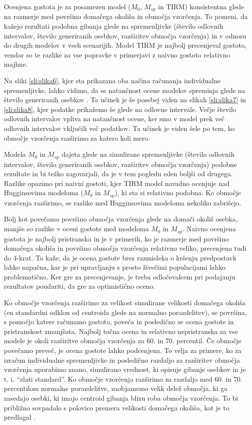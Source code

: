 Ocenjena gostota je za posamezen model ($M_0$, $M_{sp}$ in TIRM) konsistentna glede na razmerje med površino domačega okoliša in območja vzorčenja. To pomeni, da kažejo rezultati podobna gibanja glede na spremenljivke (število odlovnih intervalov, število generiranih osebkov, razširitev območja vzorčenja) in v odnosu do drugih modelov v vseh scenarijih. Model TIRM je najbolj precenjeval gostoto, vendar so te razlike za vse popravke v primerjavi z naivno gostoto relativno majhne.

Na sliki \ref{sli:slika6}, kjer sta prikazana oba načina računanja individualne spremenljivke, lahko vidimo, da se natančnost ocene modelov spreminja glede na število generiranih osebkov \citep{eberhardt_using_1990}. Ta učinek je še posebej viden na slikah \ref{sli:slika7} in \ref{sli:slika8}, kjer podatke prikažemo še glede na odlovne intervale. Večje število odlovnih intervalov vpliva na natančnost ocene, ker smo v model prek več odlovnih intervalov vključili več podatkov. Ta učinek je viden šele po tem, ko območje vzorčenja razširimo za katero koli mero.

Modela $M_0$ in $M_{sp}$ dajeta glede na simulirane spremenljivke (število odlovnih intervalov, število generiranih osebkov, razširitev območja vzorčenja) podobne rezultate in bi težko zagovarjali, da je v tem pogledu eden boljši od drugega. Razlike opazimo pri naivni gostoti, kjer TIRM model navadno ocenjuje nad Hugginsovima modeloma ($M_0$ in $M_{sp}$), ki sta si relativno podobna. Ko območje vzorčenja razširimo, se razlike med Hugginsovima modeloma nekoliko zabrišejo.

Bolj kot povečamo površino območja vzorčenja glede na domači okoliš osebka, manjše so razlike v oceni gostote med modeloma $M_0$ in $M_{sp}$. Naivno ocenjena gostota je najbolj pristranska in je v primerih, ko je razmerje med površino domačega okoliša in površino območja vzorčenja relativno veliko, precenjena tudi do 4-krat. To kaže, da je ocena gostote brez razmisleka o kršenju predpostavk lahko napačna, kar je pri upravljanju s prosto živečimi populacijami lahko problematično. Ker gre za precenjevanje, je treba odločevalcem pri podajanju rezultatov poudariti, da gre za optimistično oceno.

Ko območje vzorčenja razširimo za velikost simulirane velikosti domačega okoliša (en standardni odklon od centroida glede na normalno porazdelitev), se površina, s pomočjo katere računamo gostoto, poveča in posledično se ocena gostote in pristranskost zmanjšata. Najbolj točna ocena in relativno nepristranska za vse modele je okoli razširitve območja vzorčenja za 60. in 70. percentil. Če območje povečamo preveč, je ocena gostote lahko podcenjena. To velja za primere, ko za izračun individualne spremenljivke in posledično razdaljo za razširitev območja vzorčenja uporabimo znano, simulirano vrednost, ki opisuje gibanje osebkov in je t. i. ``zlati standard''. Ko območje vzorčenja razširimo za razdaljo med 60. in 70. percentilom normalne porazdelitve, zaobjamemo velik delež območja, ki ga zasedajo osebki, ki imajo centroid gibanja blizu roba območja vzorčenja. To bi približno sovpadalo s polovico premera velikosti domačega okoliša, kot je to predlagal \citet{dice_census_1938}.

